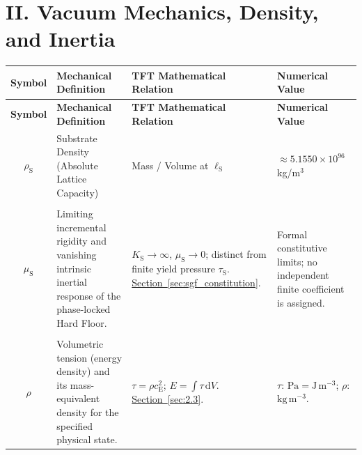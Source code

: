 \section*{II. Vacuum Mechanics, Density, and Inertia}

\vspace{0.5cm}
\noindent
\renewcommand{\arraystretch}{1.6}
\begin{longtable}{@{} c p{5.5cm} p{4cm} p{3.5cm} @{}}
\toprule
\textbf{Symbol} & \textbf{Mechanical Definition} & \textbf{TFT Mathematical Relation} & \textbf{Numerical Value} \\
\midrule
\endfirsthead

\toprule
\textbf{Symbol} & \textbf{Mechanical Definition} & \textbf{TFT Mathematical Relation} & \textbf{Numerical Value} \\
\midrule
\endhead

$\rho_{\mathrm{S}}$ & Substrate Density (Absolute Lattice Capacity) & Mass / Volume at $\ell_{\mathrm{S}}$ & $\approx 5.1550 \times 10^{96}$ kg/m$^3$ \\

\begin{tabular}[c]{@{}c@{}}$K_{\mathrm S}$ \\ $\mu_{\mathrm S}$\end{tabular} & {\raggedright Limiting incremental rigidity and vanishing intrinsic inertial response of the phase-locked Hard Floor.\par} & {\raggedright $K_{\mathrm S}\to\infty$, $\mu_{\mathrm S}\to0$; distinct from finite yield pressure $\tau_{\mathrm S}$. \newline \hyperref[sec:sgf_constitution]{Section~\ref*{sec:sgf_constitution}}.\par} & {\raggedright Formal constitutive limits; no independent finite coefficient is assigned.\par} \\

\begin{tabular}[c]{@{}c@{}}$\tau$ \\ $\rho$\end{tabular} & {\raggedright Volumetric tension (energy density) and its mass-equivalent density for the specified physical state.\par} & {\raggedright $\tau=\rho c_{\mathrm E}^2$; $E=\int\tau\,\mathrm dV$. \newline \hyperref[sec:2.3]{Section~\ref*{sec:2.3}}.\par} & {\raggedright $\tau$: $\mathrm{Pa}=\mathrm{J\,m^{-3}}$; $\rho$: $\mathrm{kg\,m^{-3}}$.\par} \\



\end{longtable}
